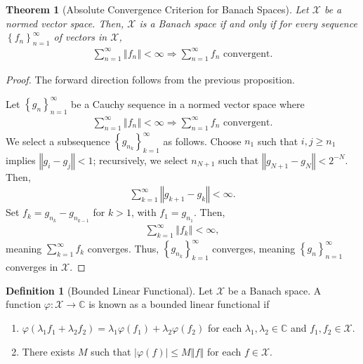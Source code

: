 \documentclass[12pt]{extarticle}
\newcommand{\C}{\mathbb{C}}
\newcommand{\norm}[1]{\left\Vert #1\right\Vert}
\newcommand{\set}[1]{\left\{#1\right\}}
\theoremstyle{plain}
\newtheorem*{theorem}{Theorem}
\theoremstyle{definition}
\newtheorem*{definition}{Definition}
\theoremstyle{note}
\renewcommand{\newline}{\hfill\break}
\begin{document}
\begin{theorem}[Absolute Convergence Criterion for Banach Spaces]
  Let $\mathcal{X}$ be a normed vector space. Then, $\mathcal{X}$ is a Banach space if and only if for every sequence $\set{f_{n}}_{n=1}^{\infty}$ of vectors in $\mathcal{X}$,
  \begin{align*}
    \sum_{n=1}^{\infty}\norm{f_n} < \infty \Rightarrow \sum_{n=1}^{\infty}f_n\text{ convergent.}
  \end{align*}
\end{theorem}
\begin{proof}
  The forward direction follows from the previous proposition.\newline

  Let $\set{g_n}_{n=1}^{\infty}$ be a Cauchy sequence in a normed vector space where
  \begin{align*}
    \sum_{n=1}^{\infty}\norm{f_n} < \infty \Rightarrow \sum_{n=1}^{\infty}f_n\text{ convergent.}
  \end{align*}
  We select a subsequence $\set{g_{n_k}}_{k=1}^{\infty}$ as follows. Choose $n_1$ such that $i,j\geq n_1$ implies $\norm{g_i - g_j} < 1$; recursively, we select $n_{N+1}$ such that $\norm{g_{N+1} - g_N} < 2^{-N}$. Then,
  \begin{align*}
    \sum_{k=1}^{\infty}\norm{g_{k+1} - g_k} < \infty.
  \end{align*}
  Set $f_k = g_{n_k} - g_{n_{k-1}}$ for $k > 1$, with $f_1 = g_{n_1}$. Then,
  \begin{align*}
    \sum_{k=1}^{\infty}\norm{f_{k}} < \infty,
  \end{align*}
  meaning $\displaystyle\sum_{k=1}^{\infty}f_k$ converges. Thus, $\set{g_{n_k}}_{k=1}^{\infty}$ converges, meaning $\set{g_{n}}_{n=1}^{\infty}$ converges in $\mathcal{X}$.
\end{proof}
\begin{definition}[Bounded Linear Functional]
Let $\mathcal{X}$ be a Banach space. A function $\varphi: \mathcal{X}\rightarrow \C$ is known as a bounded linear functional if
\begin{enumerate}[(1)]
  \item $\displaystyle \varphi(\lambda_1f_1 + \lambda_2f_2) = \lambda_1\varphi(f_1) + \lambda_2\varphi(f_2)$ for each $\lambda_1,\lambda_2\in \C$ and $f_1,f_2\in \mathcal{X}$.
  \item There exists $M$ such that $|\varphi(f)| \leq M\norm{f}$ for each $f\in \mathcal{X}$.
\end{enumerate}
\end{definition}
\end{document}
